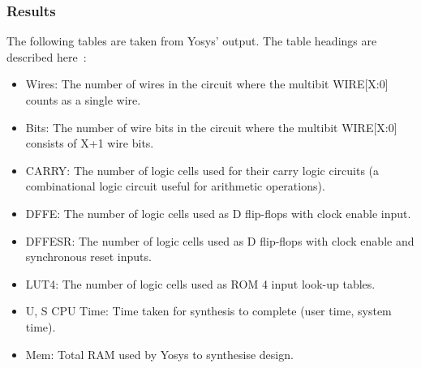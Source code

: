 \documentclass[12pt]{article}
\begin{document}
    \subsubsection{Results} \label{subsubsection:scaling_results}
      The following tables are taken from Yosys' output. The table headings are described here~\cite{techlib}:
      \begin{itemize}
        \item Wires: The number of wires in the circuit where the multibit WIRE[X:0] counts as a single wire.
        \item Bits: The number of wire bits in the circuit where the multibit WIRE[X:0] consists of X+1 wire bits.
        \item CARRY: The number of logic cells used for their carry logic circuits (a combinational logic circuit useful for arithmetic operations).
        \item DFFE: The number of logic cells used as D flip-flops with clock enable input.
        \item DFFESR: The number of logic cells used as D flip-flops with clock enable and synchronous reset inputs.
        \item LUT4: The number of logic cells used as ROM 4 input look-up tables.
        \item U, S CPU Time: Time taken for synthesis to complete (user time, system time).
        \item Mem: Total RAM used by Yosys to synthesise design.
      \end{itemize}
\end{document}
